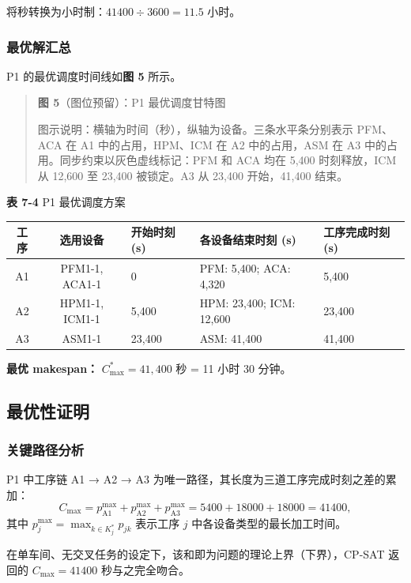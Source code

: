 \documentclass[UTF8,a4paper,12pt]{ctexart}
\begin{document}
将秒转换为小时制：$41400 \div 3600 = 11.5$ 小时。

\subsubsection{最优解汇总}
P1 的最优调度时间线如\textbf{图 5} 所示。

\begin{quote}
\textbf{图 5}（图位预留）：P1 最优调度甘特图

图示说明：横轴为时间（秒），纵轴为设备。三条水平条分别表示 PFM、ACA 在 A1 中的占用，HPM、ICM 在 A2 中的占用，ASM 在 A3 中的占用。同步约束以灰色虚线标记：PFM 和 ACA 均在 5,400 时刻释放，ICM 从 12,600 至 23,400 被锁定。A3 从 23,400 开始，41,400 结束。
\end{quote}

\begin{center}
\textbf{表 7-4} P1 最优调度方案
\begin{tabular}{cclll}
\toprule
工序 & 选用设备 & 开始时刻 (s) & 各设备结束时刻 (s) & 工序完成时刻 (s) \\
\midrule
A1 & PFM1-1, ACA1-1 & 0 & PFM: 5,400; ACA: 4,320 & 5,400 \\
A2 & HPM1-1, ICM1-1 & 5,400 & HPM: 23,400; ICM: 12,600 & 23,400 \\
A3 & ASM1-1 & 23,400 & ASM: 41,400 & 41,400 \\
\bottomrule
\end{tabular}
\end{center}

\textbf{最优 makespan：} $C_{\max}^* = 41{,}400$ 秒 = 11 小时 30 分钟。

\subsection{最优性证明}
\subsubsection{关键路径分析}
P1 中工序链 A1 → A2 → A3 为唯一路径，其长度为三道工序完成时刻之差的累加：
\begin{equation}
C_{\max} = p_{\text{A1}}^{\max} + p_{\text{A2}}^{\max} + p_{\text{A3}}^{\max} = 5400 + 18000 + 18000 = 41400,
\end{equation}
其中 $p_j^{\max} = \max_{k \in K_j^*} p_{jk}$ 表示工序 $j$ 中各设备类型的最长加工时间。

在单车间、无交叉任务的设定下，该和即为问题的理论上界（下界），CP-SAT 返回的 $C_{\max} = 41400$ 秒与之完全吻合。
\end{document}

